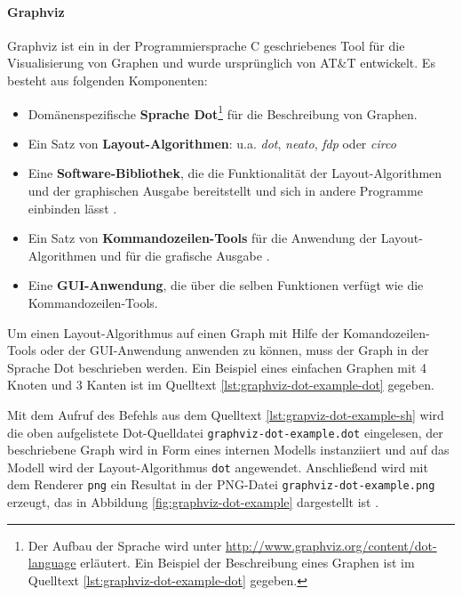 \paragraph{Graphviz}

Graphviz ist ein in der Programmiersprache C geschriebenes Tool für die Visualisierung von Graphen und wurde ursprünglich von AT\&T entwickelt. Es besteht aus folgenden Komponenten:

\begin{itemize}
    \item Domänenspezifische \textbf{Sprache Dot}\footnote{Der Aufbau der Sprache wird unter \url{http://www.graphviz.org/content/dot-language} erläutert. Ein Beispiel der Beschreibung eines Graphen ist im Quelltext \ref{lst:graphviz-dot-example-dot} gegeben.} für die Beschreibung von Graphen.
    \item Ein Satz von \textbf{Layout-Algorithmen}: u.a. \textit{dot}, \textit{neato}, \textit{fdp} oder \textit{circo} \cite{Gansner14Using, NorthGansner14Dot-Manual}
    \item Eine \textbf{Software-Bibliothek}, die die Funktionalität der Layout-Algorithmen und der graphischen Ausgabe bereitstellt und sich in andere Programme einbinden lässt \cite{Gansner14Using}.
    \item Ein Satz von \textbf{Kommandozeilen-Tools} für die Anwendung der Layout-Algorithmen und für die grafische Ausgabe \cite{NorthGansner14Dot-Manual}.
    \item Eine \textbf{GUI-Anwendung}, die über die selben Funktionen verfügt wie die Kommandozeilen-Tools.
\end{itemize}


Um einen Layout-Algorithmus auf einen Graph mit Hilfe der Komandozeilen-Tools oder der GUI-Anwendung anwenden zu können, muss der Graph in der Sprache Dot beschrieben werden. Ein Beispiel eines einfachen Graphen mit 4 Knoten und 3 Kanten ist im Quelltext \ref{lst:graphviz-dot-example-dot} gegeben.



Mit dem Aufruf des Befehls aus dem Quelltext \ref{lst:grapviz-dot-example-sh} wird die oben aufgelistete Dot-Quelldatei \lstinline{graphviz-dot-example.dot} eingelesen, der beschriebene Graph wird in Form eines internen Modells instanziiert und auf das Modell wird der Layout-Algorithmus \lstinline{dot} angewendet. Anschließend wird mit dem Renderer \lstinline{png} ein Resultat in der PNG-Datei \lstinline{graphviz-dot-example.png} erzeugt, das in Abbildung \ref{fig:graphviz-dot-example} dargestellt ist \cite{Gansner14Using}.


